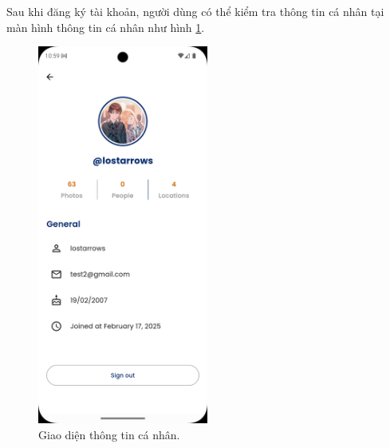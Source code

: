 Sau khi đăng ký tài khoản, người dùng có thể kiểm tra thông tin cá nhân tại màn hình thông tin cá nhân như hình \ref{fig:profile-screen}. 

\begin{figure}[H]
    \centering  
    \includegraphics[width=0.5\textwidth]{figures/c4/4-2/profile.png}
    \caption{Giao diện thông tin cá nhân.}
    \label{fig:profile-screen}
\end{figure}